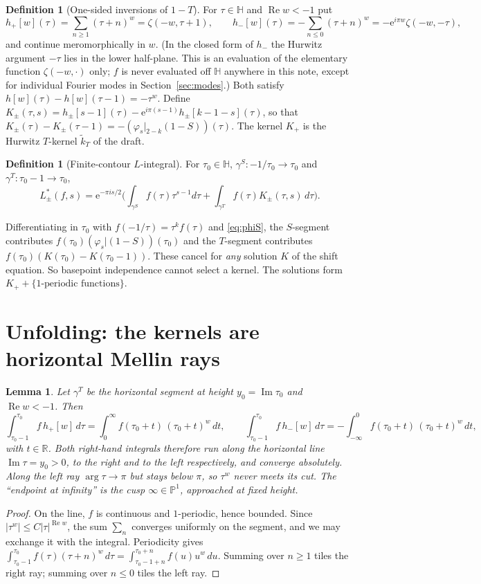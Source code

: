 \documentclass[11pt]{article}
\newtheorem{lemma}[theorem]{Lemma}
\theoremstyle{definition}
\newtheorem{definition}[theorem]{Definition}
\theoremstyle{remark}
\newcommand{\HH}{\mathbb{H}}
\newcommand{\RR}{\mathbb{R}}
\newcommand{\e}{\mathrm{e}}
\begin{document}
\begin{definition}[One-sided inversions of $1-T$]
For $\tau\in\HH$ and $\operatorname{Re}w<-1$ put
\[
h_+[w](\tau)=\sum_{n\ge1}(\tau+n)^w=\zeta(-w,\tau+1),\qquad
h_-[w](\tau)=-\sum_{n\le0}(\tau+n)^w=-\e^{i\pi w}\zeta(-w,-\tau),
\]
and continue meromorphically in $w$. (In the closed form of $h_-$ the Hurwitz argument
$-\tau$ lies in the lower half-plane. This is an evaluation of the elementary function
$\zeta(-w,\cdot)$ only; $f$ is never evaluated off $\HH$ anywhere in this note, except for
individual Fourier modes in Section~\ref{sec:modes}.) Both satisfy
$h[w](\tau)-h[w](\tau-1)=-\tau^w$. Define
$K_\pm(\tau,s)=h_\pm[s-1](\tau)-\e^{i\pi(s-1)}h_\pm[k-1-s](\tau)$, so that
$K_\pm(\tau)-K_\pm(\tau-1)=-(\varphi_s|_{2-k}(1-S))(\tau)$. The kernel $K_+$ is the Hurwitz
$T$-kernel $\widetilde k_T$ of the draft.
\end{definition}

\begin{definition}[Finite-contour $L$-integral]
For $\tau_0\in\HH$, $\gamma^S:-1/\tau_0\to\tau_0$ and $\gamma^T:\tau_0-1\to\tau_0$,
\[
L^*_\pm(f,s)=\e^{-\pi i s/2}\Big(\int_{\gamma^S}f(\tau)\tau^{s-1}d\tau
+\int_{\gamma^T}f(\tau)K_\pm(\tau,s)\,d\tau\Big).
\]
\end{definition}

Differentiating in $\tau_0$ with $f(-1/\tau)=\tau^kf(\tau)$ and \eqref{eq:phiS}, the
$S$-segment contributes $f(\tau_0)(\varphi_s|(1-S))(\tau_0)$ and the $T$-segment
contributes $f(\tau_0)(K(\tau_0)-K(\tau_0-1))$. These cancel for \emph{any} solution
$K$ of the shift equation. So basepoint independence cannot select a kernel. The
solutions form $K_++\{\text{1-periodic functions}\}$.

\section{Unfolding: the kernels are horizontal Mellin rays}

\begin{lemma}\label{lem:unfold}
Let $\gamma^T$ be the horizontal segment at height $y_0=\operatorname{Im}\tau_0$ and
$\operatorname{Re}w<-1$. Then
\[
\int_{\tau_0-1}^{\tau_0}f\,h_+[w]\,d\tau=\int_{0}^{\infty}f(\tau_0+t)\,(\tau_0+t)^w\,dt,\qquad
\int_{\tau_0-1}^{\tau_0}f\,h_-[w]\,d\tau=-\int_{-\infty}^{0}f(\tau_0+t)\,(\tau_0+t)^w\,dt,
\]
with $t\in\RR$. Both right-hand integrals therefore run along the horizontal line
$\operatorname{Im}\tau=y_0>0$, to the right and to the left respectively, and converge
absolutely. Along the left ray $\arg\tau\to\pi$ but stays below $\pi$, so $\tau^w$ never
meets its cut. The ``endpoint at infinity'' is the cusp $\infty\in\mathbb{P}^1$, approached at fixed height.
\end{lemma}
\begin{proof}
On the line, $f$ is continuous and $1$-periodic, hence bounded. Since $|\tau^w|\le C|\tau|^{\operatorname{Re}w}$,
the sum $\sum_n$ converges uniformly on the segment, and we may exchange it with the
integral. Periodicity gives
$\int_{\tau_0-1}^{\tau_0}f(\tau)(\tau+n)^w\,d\tau=\int_{\tau_0-1+n}^{\tau_0+n}f(u)u^w\,du$.
Summing over $n\ge1$ tiles the right ray; summing over $n\le0$ tiles the left ray.
\end{proof}
\end{document}
